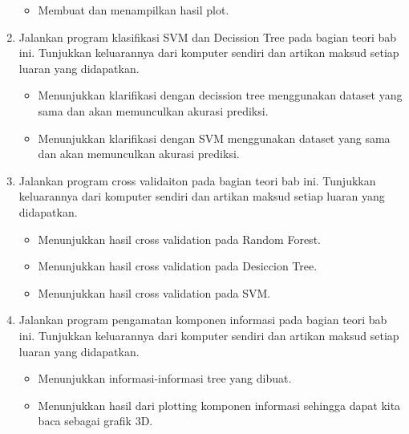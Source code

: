 \begin{enumerate}
\begin{itemize}
		
		\item Membuat dan menampilkan hasil plot.
		
	\end{itemize}
	\item Jalankan program klasifikasi SVM dan Decission Tree pada bagian teori bab ini. Tunjukkan keluarannya dari komputer sendiri dan artikan maksud setiap luaran yang didapatkan.
	\hfill\break
	\begin{itemize}
		\item Menunjukkan klarifikasi dengan decission tree menggunakan dataset yang sama dan akan memunculkan akurasi prediksi.
		
		\item Menunjukkan klarifikasi dengan SVM menggunakan dataset yang sama dan akan memunculkan akurasi prediksi.
		
	\end{itemize}
	\item Jalankan program cross validaiton pada bagian teori bab ini. Tunjukkan keluarannya dari komputer sendiri dan artikan maksud setiap luaran yang didapatkan.
	\hfill\break
	\begin{itemize}
		\item Menunjukkan hasil cross validation pada Random Forest.
		
		\item Menunjukkan hasil cross validation pada Desiccion Tree.
		
		\item Menunjukkan hasil cross validation pada SVM.
		
	\end{itemize}
	\item Jalankan program pengamatan komponen informasi pada bagian teori bab ini. Tunjukkan keluarannya dari komputer sendiri dan artikan maksud setiap luaran yang didapatkan.
	\hfill\break
	\begin{itemize}
		\item Menunjukkan informasi-informasi tree yang dibuat.
		
		\item Menunjukkan hasil dari plotting komponen informasi sehingga dapat kita baca sebagai grafik 3D.
		
	\end{itemize}
\end{enumerate}
